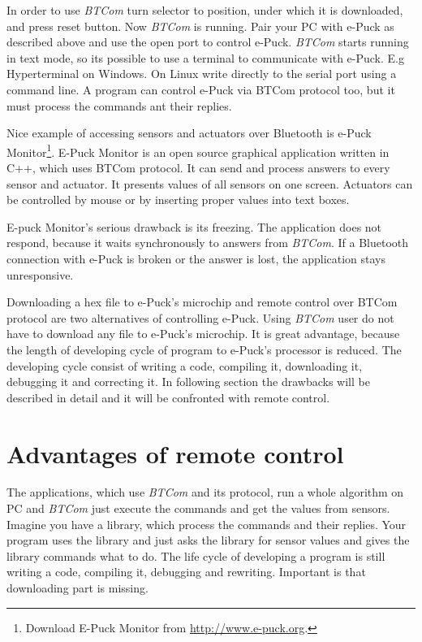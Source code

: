 	In order to use {\it BTCom} turn selector to position, under which it is downloaded, and press reset button.
	Now {\it BTCom} is running.  Pair your PC with e-Puck as described above and use the open port
	to control e-Puck.
	{\it BTCom} starts running in text mode, so its possible to use a terminal to communicate with e-Puck.
	E.g Hyperterminal on Windows. On Linux write directly to the serial port using a command line.
	A program can control e-Puck via BTCom protocol too, but it must process the commands ant their replies.
	 
	Nice example of accessing sensors and actuators over Bluetooth is 
	e-Puck Monitor\footnote{\small{Download E-Puck Monitor from \url{http://www.e-puck.org}.}}.
	E-Puck Monitor is an open source graphical application written in C++, which uses BTCom protocol. 
	It can send and process answers to every sensor and actuator.
	It presents values of all sensors on one screen. Actuators can be controlled by mouse or by inserting
	proper values into text boxes.

	E-puck Monitor's serious drawback is its freezing. The application does not respond, 
	because it waits synchronously to answers from {\it BTCom}.
	If a Bluetooth connection with e-Puck is broken or the answer is lost, the application stays unresponsive.
	 
	Downloading a hex file to e-Puck's microchip and remote control over BTCom protocol are two alternatives
	of controlling e-Puck.
	Using {\it BTCom} user do not have to download any file to e-Puck's microchip.
	It is great advantage, because the length of developing cycle of program to e-Puck's processor is reduced.
	The developing cycle consist of	writing a code, compiling it, downloading it, debugging it and correcting it.
	In following section the drawbacks will be described in detail and it will be confronted with
	remote control.
\section{Advantages of remote control} \label{sec:remote}
	The applications, which use {\it BTCom} and its protocol, run a whole algorithm on PC and {\it BTCom} just 
	execute the commands and get the values from sensors. Imagine you have a library, which process the commands
	and their replies. Your program uses the library and just asks the library for sensor values and
	gives the library commands what to do. The life cycle of developing a program is still writing a code, 
	compiling it, debugging and rewriting. Important is that downloading part is missing.
	 
